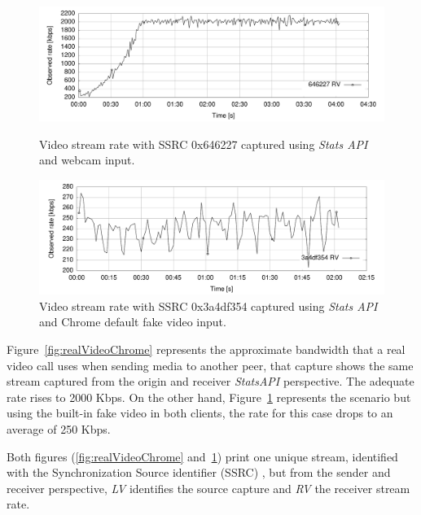  \begin{figure}[h]
  \centering
   \includegraphics[width=1\textwidth]{./figures/realVideoChrome.pdf}
     \caption[Video stream rate with SSRC 0x646227 captured using {\it Stats API} and webcam input]{Video stream rate with SSRC 0x646227 captured using {\it Stats API} and webcam input.}
	\label{fig:realVideoChrome}
  \centering
	\includegraphics[width=1\textwidth]{./figures/automatedVideoChrome.pdf}
	\caption[Video stream rate with SSRC 0x3a4df354 captured using {\it Stats API} and Chrome default fake content]{Video stream rate with SSRC 0x3a4df354 captured using {\it Stats API} and Chrome default fake video input.}
	\label{fig:automatedVideoChrome}
\end{figure}

Figure~\ref{fig:realVideoChrome} represents the approximate bandwidth that a real video call uses when sending media to another peer, that capture shows the same stream captured from the origin and receiver {\it StatsAPI} perspective. The adequate rate rises to 2000 Kbps. On the other hand, Figure~\ref{fig:automatedVideoChrome} represents the scenario but using the built-in fake video in both clients, the rate for this case drops to an average of 250 Kbps. 

Both figures (\ref{fig:realVideoChrome} and~\ref{fig:automatedVideoChrome}) print one unique stream, identified with the Synchronization Source identifier (SSRC) , but from the sender and receiver perspective, {\it LV} identifies the source capture and {\it RV} the receiver stream rate. 

